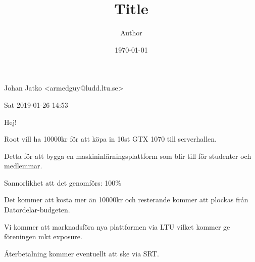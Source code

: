 \documentclass[11pt]{article}
\title{Title}
\author{Author}
\date{\today}
\theoremstyle{definition}
\begin{document}
Johan Jatko <armedguy@ludd.ltu.se>

Sat 2019-01-26 14:53

Hej!

Root vill ha 10000kr för att köpa in 10st GTX 1070 till serverhallen.


Detta för att bygga en maskininlärningsplattform som blir till för
studenter och medlemmar.


Sannorlikhet att det genomförs: 100\%

Det kommer att kosta mer än 10000kr och resterande kommer att plockas
från Datordelar-budgeten.

Vi kommer att marknadsföra nya plattformen via LTU vilket kommer ge
föreningen mkt exposure.

Återbetalning kommer eventuellt att ske via SRT.
\end{document}
